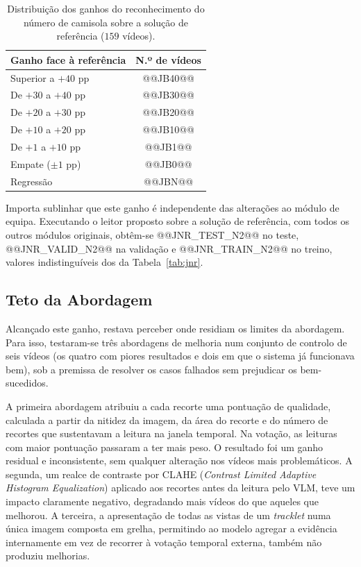 \begin{table}[htbp]
    \centering
    \caption{Distribuição dos ganhos do reconhecimento do número de camisola sobre a solução de
    referência ($159$ vídeos).}
    \label{tab:jnr-distribuicao}
    \begin{tabular}{|l|c|}
        \hline
        \textbf{Ganho face à referência} & \textbf{N.º de vídeos} \\
        \hline
        Superior a $+40$ pp & @@JB40@@ \\
        \hline
        De $+30$ a $+40$ pp & @@JB30@@ \\
        \hline
        De $+20$ a $+30$ pp & @@JB20@@ \\
        \hline
        De $+10$ a $+20$ pp & @@JB10@@ \\
        \hline
        De $+1$ a $+10$ pp  & @@JB1@@ \\
        \hline
        Empate ($\pm 1$ pp) & @@JB0@@ \\
        \hline
        Regressão           & @@JBN@@ \\
        \hline
    \end{tabular}
\end{table}

Importa sublinhar que este ganho é independente das alterações ao módulo de equipa. Executando o
leitor proposto sobre a solução de referência, com todos os outros módulos originais, obtêm-se
@@JNR_TEST_N2@@ no teste, @@JNR_VALID_N2@@ na validação e @@JNR_TRAIN_N2@@ no treino, valores
indistinguíveis dos da Tabela~\ref{tab:jnr}.

\subsection{Teto da Abordagem}\label{sec:res_jnr_teto}

Alcançado este ganho, restava perceber onde residiam os limites da abordagem. Para isso, testaram-se
três abordagens de melhoria num conjunto de controlo de seis vídeos (os quatro com piores resultados
e dois em que o sistema já funcionava bem), sob a premissa de resolver os casos falhados sem
prejudicar os bem-sucedidos.

A primeira abordagem atribuiu a cada recorte uma pontuação de qualidade, calculada a partir da nitidez
da imagem, da área do recorte e do número de recortes que sustentavam a leitura na janela temporal.
Na votação, as leituras com maior pontuação passaram a ter mais peso. O resultado foi um ganho
residual e inconsistente, sem qualquer alteração nos vídeos mais problemáticos. A segunda, um realce
de contraste por CLAHE (\emph{Contrast Limited Adaptive Histogram Equalization}) aplicado aos
recortes antes da leitura pelo VLM, teve um impacto claramente negativo, degradando mais vídeos do
que aqueles que melhorou. A terceira, a apresentação de todas as vistas de um \emph{tracklet} numa
única imagem composta em grelha, permitindo ao modelo agregar a evidência internamente em vez de
recorrer à votação temporal externa, também não produziu melhorias.

